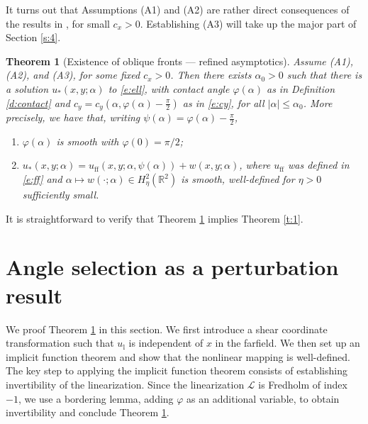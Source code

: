 \documentclass[10pt]{article}
\newtheorem{Theorem}[Lemma]{Theorem}
\newcommand{\R}{\mathbb{R}}
\renewcommand{\leq}{\leqslant}
\begin{document}
It turns out that Assumptions (A1) and (A2) are rather direct consequences of the results in \cite{Monteiro_Scheel}, for small $c_x>0$. Establishing (A3) will take up the major part of Section \ref{s:4}.



\begin{Theorem}[Existence of oblique fronts --- refined asymptotics]\label{Theorem:all_c_x}
Assume (A1), (A2), and (A3), for some fixed $c_x>0$. Then there exists $\alpha_0>0$ such that there is a solution  $u_*(x,y;\alpha)$ to \eqref{e:ell}, with contact angle  $\varphi(\alpha)$ as in Definition \ref{d:contact} and $c_y=c_y(\alpha,\varphi(\alpha)-\frac{\pi}{2})$ as in \eqref{e:cy}, for all $|\alpha|\leq \alpha_0$. 
More precisely, we have that, writing $\psi(\alpha)=\varphi(\alpha)-\frac{\pi}{2}$,
\begin{enumerate}
\item $\varphi(\alpha)$ is smooth with $\varphi(0)=\pi/2$;
\item $u_*(x,y;\alpha)=u_\mathrm{ff}(x,y;\alpha,
\psi(\alpha))+w(x,y;\alpha)$, where $u_\mathrm{ff}$ was defined in \eqref{e:ff} and $\alpha\mapsto w(\cdot;\alpha)\in H^2_\eta(\R^2)$ is smooth, well-defined for $\eta>0$ sufficiently small.
\end{enumerate}
\end{Theorem}
It is straightforward to verify that Theorem \ref{Theorem:all_c_x} implies Theorem \ref{t:1}. 




\section{Angle selection as a perturbation result}\label{s:3}
We proof Theorem \ref{Theorem:all_c_x} in this section. We first introduce a shear coordinate transformation such that $u_\mathrm{l}$ is independent of $x$ in the farfield. We then set up an implicit function theorem and show that the nonlinear mapping is well-defined. The key step to applying the implicit function theorem consists of establishing invertibility of the linearization. Since the linearization $\mathscr{L}$ is Fredholm of index $-1$, we use a bordering lemma, adding $\varphi$ as an additional variable, to obtain invertibility and conclude Theorem \ref{Theorem:all_c_x}.
\end{document}
